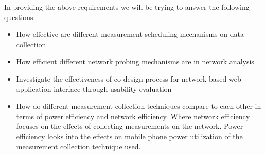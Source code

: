 In providing the above requirements we will be trying to answer the following questions:
\begin{itemize} %
	\item How effective are different measurement scheduling mechanisms on data collection 
	\item How efficient different network probing mechanisms are in network analysis 
	\item Investigate the effectiveness of co-design process for network based web application interface through usability evaluation %
	\item How do different measurement collection techniques compare to each other in terms of power efficiency and network efficiency. Where network efficiency focuses on the effects of collecting measurements on the network. Power efficiency looks into the effects on mobile phone power utilization of the measurement collection technique used.
\end{itemize}